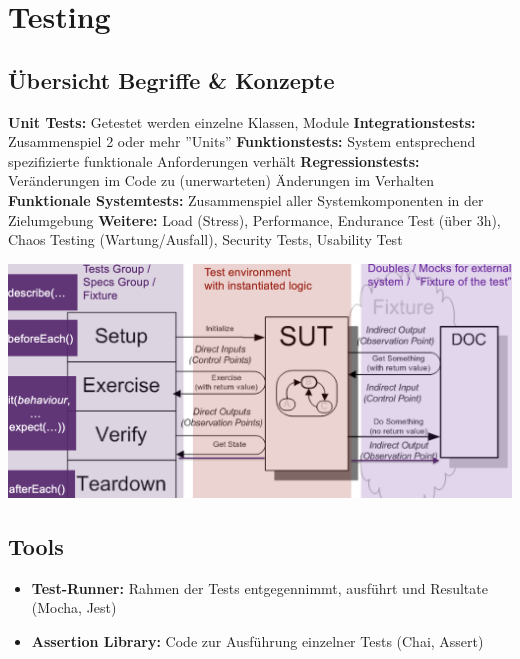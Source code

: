 
\section{Testing}


\subsection{Übersicht Begriffe \& Konzepte}
\textbf{Unit Tests:} Getestet werden einzelne Klassen, Module
\textbf{Integrationstests:} Zusammenspiel 2 oder mehr ''Units''
\textbf{Funktionstests:} System entsprechend spezifizierte funktionale Anforderungen verhält
\textbf{Regressionstests:} Veränderungen im Code zu (unerwarteten) Änderungen im Verhalten
\textbf{Funktionale Systemtests:} Zusammenspiel aller Systemkomponenten in der Zielumgebung
\textbf{Weitere:} Load (Stress), Performance, Endurance Test (über 3h), Chaos Testing (Wartung/Ausfall), Security Tests, Usability Test

    \hspace{-6pt} \includegraphics[scale=.237]{graphic/testing/Unit-Testing.png}
\vspace{-8pt}

\subsection{Tools}
\begin{itemize}
    \item \textbf{Test-Runner:} Rahmen der Tests entgegennimmt, ausführt und Resultate (Mocha, Jest)
    \item \textbf{Assertion Library:} Code zur Ausführung einzelner Tests (Chai, Assert)
\end{itemize}



